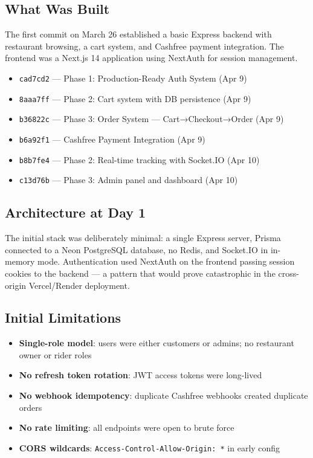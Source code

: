 \documentclass[11pt,a4paper,twoside]{book}
\begin{document}
\subsection{What Was Built}

The first commit on March 26 established a basic Express backend with restaurant
browsing, a cart system, and Cashfree payment integration.  The frontend was a
Next.js 14 application using NextAuth for session management.

\begin{tcolorbox}[commit,title=Milestone commits]
\begin{itemize}[leftmargin=1em,nosep,topsep=2pt]
  \item \texttt{cad7cd2} — Phase 1: Production-Ready Auth System (Apr 9)
  \item \texttt{8aaa7ff} — Phase 2: Cart system with DB persistence (Apr 9)
  \item \texttt{b36822c} — Phase 3: Order System — Cart→Checkout→Order (Apr 9)
  \item \texttt{b6a92f1} — Cashfree Payment Integration (Apr 9)
  \item \texttt{b8b7fe4} — Phase 2: Real-time tracking with Socket.IO (Apr 10)
  \item \texttt{c13d76b} — Phase 3: Admin panel and dashboard (Apr 10)
\end{itemize}
\end{tcolorbox}

\subsection{Architecture at Day 1}

The initial stack was deliberately minimal: a single Express server, Prisma
connected to a Neon PostgreSQL database, no Redis, and Socket.IO in in-memory
mode.  Authentication used NextAuth on the frontend passing session cookies to
the backend — a pattern that would prove catastrophic in the cross-origin
Vercel/Render deployment.

\subsection{Initial Limitations}

\begin{itemize}[leftmargin=1.4em]
  \item \textbf{Single-role model}: users were either customers or admins; no restaurant owner or rider roles
  \item \textbf{No refresh token rotation}: JWT access tokens were long-lived
  \item \textbf{No webhook idempotency}: duplicate Cashfree webhooks created duplicate orders
  \item \textbf{No rate limiting}: all endpoints were open to brute force
  \item \textbf{CORS wildcards}: \texttt{Access-Control-Allow-Origin: *} in early config
\end{itemize}
\end{document}
